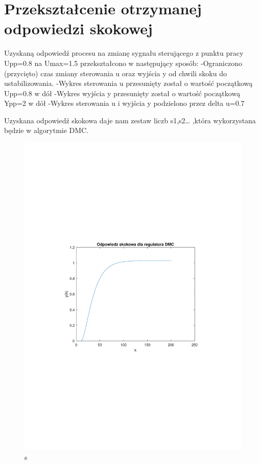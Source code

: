 \section{Przekształcenie otrzymanej odpowiedzi skokowej}

Uzyskaną odpowiedź procesu na zmianę sygnału sterującego z punktu pracy Upp=\num{0.8} na Umax=\num{1.5} przekształcono w następujący sposób:
-Ograniczono (przycięto) czas zmiany sterowania u oraz wyjścia y od chwili skoku do ustabilizowania.
-Wykres sterowania u przesunięty został o wartość początkową Upp=\num{0.8} w dół
-Wykres wyjścia y przesunięty został o wartość początkową Ypp=\num{2} w dół
-Wykres sterowania u i wyjścia y podzielono przez delta u=\num{0.7}

Uzyskana odpowiedź skokowa daje nam zestaw liczb s1,s2… ,która wykorzystana będzie w algorytmie DMC.

\begin{figure}[H]
    \centering
    \includegraphics[scale=0.8]{../projekt/zad3/s.pdf}
    \caption{ s }
\end{figure}
